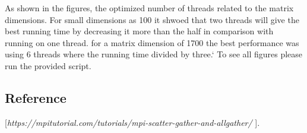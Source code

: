 \documentclass[preprint,pre,floats,aps,amsmath,amssymb]{revtex4}
\begin{document}
As shown in the figures, the optimized number of threads related to the matrix dimensions. For small dimensions as 100 it shwoed that two threads will give the best running time by decreasing it more than the half in comparison with running on one thread.
for a matrix dimension of 1700 the best performance was using 6 threads where the running time divided by three.`
To see all figures please run the provided script. 
\begin{thebibliography}{9}
	\section{Reference}
 
	[\textit{https://mpitutorial.com/tutorials/mpi-scatter-gather-and-allgather/ }]. 

	

	
\end{thebibliography}
\appendix*
\end{document}

